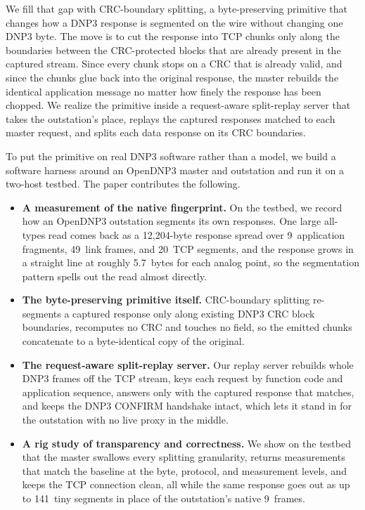 \documentclass[conference]{IEEEtran}
\begin{document}
We fill that gap with CRC-boundary splitting, a byte-preserving primitive that
changes how a DNP3 response is segmented on the wire without changing one DNP3
byte. The move is to cut the response into TCP chunks only along the boundaries
between the CRC-protected blocks that are already present in the captured stream.
Since every chunk stops on a CRC that is already valid, and since the chunks glue
back into the original response, the master rebuilds the identical application
message no matter how finely the response has been chopped. We realize the
primitive inside a request-aware split-replay server that takes the outstation's
place, replays the captured responses matched to each master request, and splits
each data response on its CRC boundaries.

To put the primitive on real DNP3 software rather than a model, we build a
software harness around an OpenDNP3 master and outstation and run it on a two-host
testbed. The paper contributes the following.

\begin{itemize}
\item \textbf{A measurement of the native fingerprint.} On the testbed, we record
how an OpenDNP3 outstation segments its own responses. One large all-types read
comes back as a 12{,}204-byte response spread over 9~application fragments,
49~link frames, and 20~TCP segments, and the response grows in a straight line at
roughly 5.7~bytes for each analog point, so the segmentation pattern spells out
the read almost directly.
\item \textbf{The byte-preserving primitive itself.} CRC-boundary splitting
re-segments a captured response only along existing DNP3 CRC block boundaries,
recomputes no CRC and touches no field, so the emitted chunks concatenate to a
byte-identical copy of the original.
\item \textbf{The request-aware split-replay server.} Our replay server rebuilds
whole DNP3 frames off the TCP stream, keys each request by function code and
application sequence, answers only with the captured response that matches, and
keeps the DNP3 CONFIRM handshake intact, which lets it stand in for the
outstation with no live proxy in the middle.
\item \textbf{A rig study of transparency and correctness.} We show on the
testbed that the master swallows every splitting granularity, returns
measurements that match the baseline at the byte, protocol, and measurement
levels, and keeps the TCP connection clean, all while the same response goes out
as up to 141~tiny segments in place of the outstation's native 9~frames.
\end{itemize}
\end{document}
